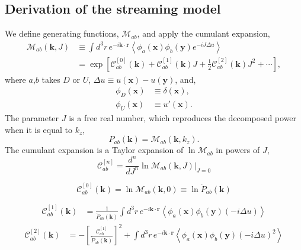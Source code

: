 \documentclass[a4paper,11pt, fleqn]{article}
\begin{document}
\newpage
\subsection{Derivation of the streaming model}


We define generating functions, $\mathcal{M}_{ab}$, and apply the cumulant
expansion,
\begin{align}
  \mathcal{M}_{ab}(\bm{k}, J) &\equiv
  \int \!\! d^3 r \, e^{-i\bm{k}\cdot\bm{r}} \left\langle
  \phi_a(\bm{x}) \phi_b(\bm{y}) e^{-iJ\Delta u} \right\rangle\\
  &= \exp\left[
    \mathscr{C}_{ab}^{[0]}(\bm{k}) +
    \mathscr{C}_{ab}^{[1]}(\bm{k}) J +
    \frac{1}{2} \mathscr{C}_{ab}^{[2]}(\bm{k}) J^2 + \cdots
    \right],
\end{align}
where $a$,$b$ takes $D$ or $U$, $\Delta u \equiv u(\bm{x}) - u(\bm{y})$, and,
\begin{align}
  \phi_D(\bm{x}) &\equiv \delta(\bm{x}),\\
  \phi_U(\bm{x}) &\equiv u'(\bm{x}).
\end{align}
The parameter $J$ is a free real number, which reproduces the decomposed power when it is equal to $k_z$,
\begin{equation}
  P_{ab}(\bm{k}) = \mathcal{M}_{ab}(\bm{k}, k_z).
\end{equation}
%
The cumulant expansion is a Taylor expansion of $\ln \mathcal{M}_{ab}$ in powers of $J$,
%
\begin{equation}
  \mathscr{C}_{ab}^{[n]} = \frac{d^n}{dJ^n}
  \ln \mathcal{M}_{ab}(\bm{k}, J) \Big|_{J=0}
\end{equation}

\begin{equation}
  \mathscr{C}_{ab}^{[0]}(\bm{k}) =
  \ln \mathcal{M}_{ab}(\bm{k}, 0) \equiv \ln \mathring{P}_{ab}(\bm{k})
\end{equation}

\begin{align}
  \mathscr{C}_{ab}^{[1]}(\bm{k}) &= \frac{1}{\mathring{P}_{ab}(\bm{k})}
  \int\!d^3 r \, e^{-i\bm{k}\cdot\bm{r}} \left\langle
  \phi_a(\bm{x}) \phi_b(\bm{y}) (-i \Delta u) \right\rangle
\end{align}
%
\begin{align}
  \mathscr{C}_{ab}^{[2]}(\bm{k}) &=
  - \left[ \frac{\mathscr{C}_{ab}^{[1]}}{\mathring{P}_{ab}(\bm{k})} \right]^2
  + \int\!d^3 r \, e^{-i\bm{k}\cdot\bm{r}} \left\langle
  \phi_a(\bm{x}) \phi_b(\bm{y}) (-i \Delta u)^2 \right\rangle
\end{align}
\end{document}
